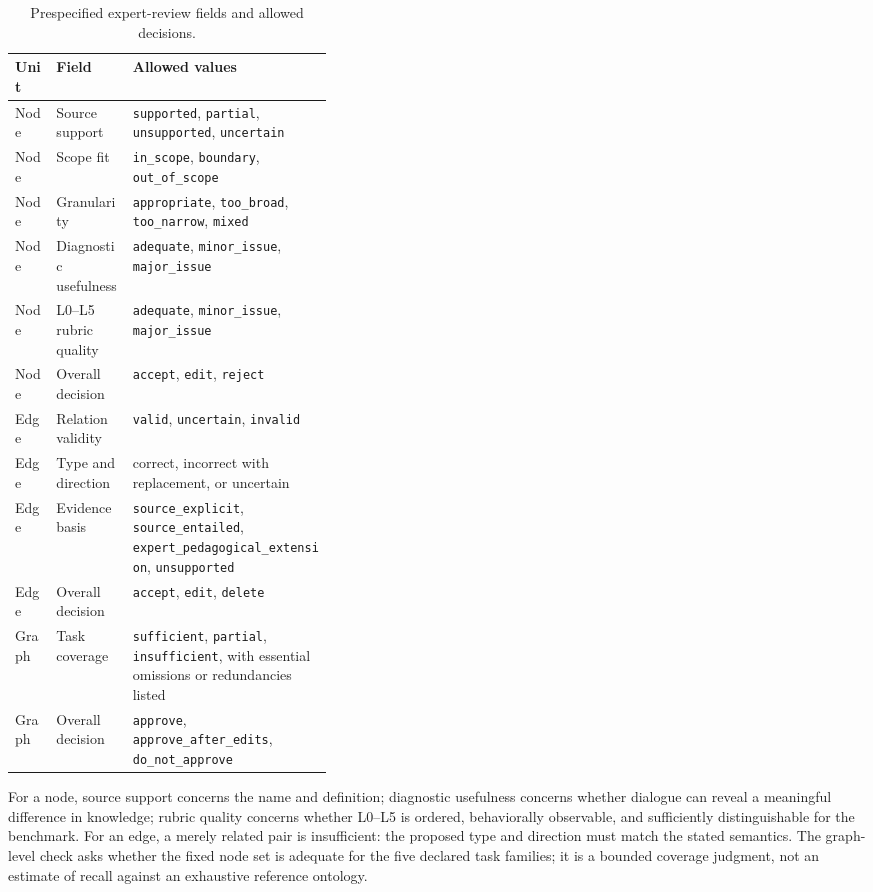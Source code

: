 \begin{table}[h!]
\caption{Prespecified expert-review fields and allowed decisions.}
\label{tab:graph-review-fields}
\centering
\small
\begin{tabularx}{\linewidth}{>{\raggedright\arraybackslash}p{0.13\linewidth}>{\raggedright\arraybackslash}p{0.24\linewidth}X}
\toprule
\textbf{Unit} & \textbf{Field} & \textbf{Allowed values} \\
\midrule
Node & Source support & \texttt{supported}, \texttt{partial}, \texttt{unsupported}, \texttt{uncertain} \\
Node & Scope fit & \texttt{in\_scope}, \texttt{boundary}, \texttt{out\_of\_scope} \\
Node & Granularity & \texttt{appropriate}, \texttt{too\_broad}, \texttt{too\_narrow}, \texttt{mixed} \\
Node & Diagnostic usefulness & \texttt{adequate}, \texttt{minor\_issue}, \texttt{major\_issue} \\
Node & L0--L5 rubric quality & \texttt{adequate}, \texttt{minor\_issue}, \texttt{major\_issue} \\
Node & Overall decision & \texttt{accept}, \texttt{edit}, \texttt{reject} \\
\midrule
Edge & Relation validity & \texttt{valid}, \texttt{uncertain}, \texttt{invalid} \\
Edge & Type and direction & correct, incorrect with replacement, or uncertain \\
Edge & Evidence basis & \texttt{source\_explicit}, \texttt{source\_entailed}, \texttt{expert\_pedagogical\_extension}, \texttt{unsupported} \\
Edge & Overall decision & \texttt{accept}, \texttt{edit}, \texttt{delete} \\
\midrule
Graph & Task coverage & \texttt{sufficient}, \texttt{partial}, \texttt{insufficient}, with essential omissions or redundancies listed \\
Graph & Overall decision & \texttt{approve}, \texttt{approve\_after\_edits}, \texttt{do\_not\_approve} \\
\bottomrule
\end{tabularx}
\end{table}

For a node, source support concerns the name and definition; diagnostic usefulness concerns whether dialogue can reveal a meaningful difference in knowledge; rubric quality concerns whether L0--L5 is ordered, behaviorally observable, and sufficiently distinguishable for the benchmark. For an edge, a merely related pair is insufficient: the proposed type and direction must match the stated semantics. The graph-level check asks whether the fixed node set is adequate for the five declared task families; it is a bounded coverage judgment, not an estimate of recall against an exhaustive reference ontology.

